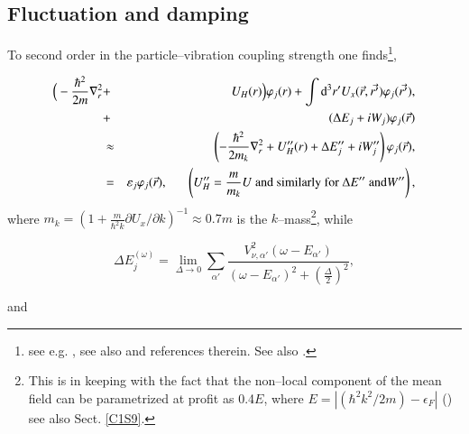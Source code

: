 \subsection{Fluctuation and damping}
 To second order in the particle--vibration coupling strength one finds\footnote{see e.g. \cite{Brink:05}, see also \cite{Mahaux:85} and references therein. See also \cite{Bernard:81}.},

\begin{eqnarray}\label{eqn:36}
\nonumber
\Big( -\frac{\hbar^2}{2m} \nabla_r^2 &+& U_H(r)\Big) \varphi_{j}(r) + \int {\rm d}^3 r' U_x(\vec{r},\vec{r'})\varphi_j(\vec{r'}), \\
\nonumber
&+& (\Delta E_j +iW_j)\varphi_j(\vec{r}) \\
&\approx& \left( -\frac{\hbar^2}{2m_k} \nabla_r^2 + U_H''(r) + \Delta E''_j + iW''_j \right) \varphi_j(\vec{r}), \\
\nonumber
&=& \varepsilon_j\varphi_j(\vec{r}), \;\;\;\;\;\; \left( U_H'' = \frac{m}{m_k} U\text{ and similarly for }\Delta E''\text{ and} W'' \right), 
\end{eqnarray}
 where  $m_k=\left(1+\frac{m}{\hbar^2 k}\partial U_x/\partial k\right)^{-1}\approx 0.7m$ is the $k$--mass\footnote{This is in keeping with the fact that the non--local component of the mean field can be parametrized at profit as 0.4$E$, where $E=|(\hbar^2k^2/2m)-\epsilon_F|$ (\cite{Perey:62}) see also Sect. \ref{C1S9}.}, while

\begin{equation}\label{eqn:37a}
\Delta E_j^{(\omega)}  = \lim_{\Delta \rightarrow 0} \sum_{\alpha'} \frac{V^2_{\nu ,\alpha'} (\omega-E_{\alpha'})}{(\omega -E_{\alpha'})^2 + (\frac{\Delta}{2})^2},
\end{equation}

\noindent and

